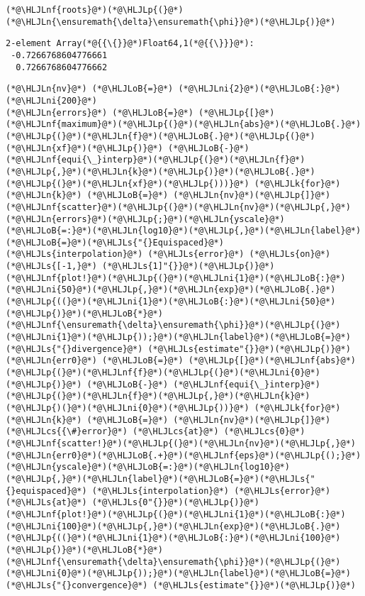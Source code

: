 \documentclass[12pt,a4paper]{article}
\newcommand{\HLJLk}[1]{\textcolor[RGB]{148,91,176}{\textbf{#1}}}
\newcommand{\HLJLn}[1]{#1}
\newcommand{\HLJLnf}[1]{\textcolor[RGB]{66,102,213}{#1}}
\newcommand{\HLJLs}[1]{\textcolor[RGB]{201,61,57}{#1}}
\newcommand{\HLJLni}[1]{\textcolor[RGB]{59,151,46}{#1}}
\newcommand{\HLJLoB}[1]{\textcolor[RGB]{102,102,102}{\textbf{#1}}}
\newcommand{\HLJLp}[1]{#1}
\newcommand{\HLJLcs}[1]{\textcolor[RGB]{153,153,119}{\textit{#1}}}
\begin{document}
\begin{lstlisting}
(*@\HLJLnf{roots}@*)(*@\HLJLp{(}@*)(*@\HLJLn{\ensuremath{\delta}\ensuremath{\phi}}@*)(*@\HLJLp{)}@*)
\end{lstlisting}

\begin{lstlisting}
2-element Array(*@{{\{}}@*)Float64,1(*@{{\}}}@*):
 -0.7266768604776661
  0.7266768604776662
\end{lstlisting}


\begin{lstlisting}
(*@\HLJLn{nv}@*) (*@\HLJLoB{=}@*) (*@\HLJLni{2}@*)(*@\HLJLoB{:}@*)(*@\HLJLni{200}@*)
(*@\HLJLn{errors}@*) (*@\HLJLoB{=}@*) (*@\HLJLp{[}@*)(*@\HLJLnf{maximum}@*)(*@\HLJLp{(}@*)(*@\HLJLn{abs}@*)(*@\HLJLoB{.}@*)(*@\HLJLp{(}@*)(*@\HLJLn{f}@*)(*@\HLJLoB{.}@*)(*@\HLJLp{(}@*)(*@\HLJLn{xf}@*)(*@\HLJLp{)}@*) (*@\HLJLoB{-}@*) (*@\HLJLnf{equi{\_}interp}@*)(*@\HLJLp{(}@*)(*@\HLJLn{f}@*)(*@\HLJLp{,}@*)(*@\HLJLn{k}@*)(*@\HLJLp{)}@*)(*@\HLJLoB{.}@*)(*@\HLJLp{(}@*)(*@\HLJLn{xf}@*)(*@\HLJLp{)))}@*) (*@\HLJLk{for}@*) (*@\HLJLn{k}@*) (*@\HLJLoB{=}@*) (*@\HLJLn{nv}@*)(*@\HLJLp{]}@*)
(*@\HLJLnf{scatter}@*)(*@\HLJLp{(}@*)(*@\HLJLn{nv}@*)(*@\HLJLp{,}@*)(*@\HLJLn{errors}@*)(*@\HLJLp{;}@*)(*@\HLJLn{yscale}@*)(*@\HLJLoB{=:}@*)(*@\HLJLn{log10}@*)(*@\HLJLp{,}@*)(*@\HLJLn{label}@*)(*@\HLJLoB{=}@*)(*@\HLJLs{"{}Equispaced}@*) (*@\HLJLs{interpolation}@*) (*@\HLJLs{error}@*) (*@\HLJLs{on}@*) (*@\HLJLs{[-1,}@*) (*@\HLJLs{1]"{}}@*)(*@\HLJLp{)}@*)
(*@\HLJLnf{plot!}@*)(*@\HLJLp{(}@*)(*@\HLJLni{1}@*)(*@\HLJLoB{:}@*)(*@\HLJLni{50}@*)(*@\HLJLp{,}@*)(*@\HLJLn{exp}@*)(*@\HLJLoB{.}@*)(*@\HLJLp{((}@*)(*@\HLJLni{1}@*)(*@\HLJLoB{:}@*)(*@\HLJLni{50}@*)(*@\HLJLp{)}@*)(*@\HLJLoB{*}@*)(*@\HLJLnf{\ensuremath{\delta}\ensuremath{\phi}}@*)(*@\HLJLp{(}@*)(*@\HLJLni{1}@*)(*@\HLJLp{));}@*)(*@\HLJLn{label}@*)(*@\HLJLoB{=}@*)(*@\HLJLs{"{}divergence}@*) (*@\HLJLs{estimate"{}}@*)(*@\HLJLp{)}@*)
(*@\HLJLn{err0}@*) (*@\HLJLoB{=}@*) (*@\HLJLp{[}@*)(*@\HLJLnf{abs}@*)(*@\HLJLp{(}@*)(*@\HLJLnf{f}@*)(*@\HLJLp{(}@*)(*@\HLJLni{0}@*)(*@\HLJLp{)}@*) (*@\HLJLoB{-}@*) (*@\HLJLnf{equi{\_}interp}@*)(*@\HLJLp{(}@*)(*@\HLJLn{f}@*)(*@\HLJLp{,}@*)(*@\HLJLn{k}@*)(*@\HLJLp{)(}@*)(*@\HLJLni{0}@*)(*@\HLJLp{))}@*) (*@\HLJLk{for}@*) (*@\HLJLn{k}@*) (*@\HLJLoB{=}@*) (*@\HLJLn{nv}@*)(*@\HLJLp{]}@*) (*@\HLJLcs{{\#}error}@*) (*@\HLJLcs{at}@*) (*@\HLJLcs{0}@*)
(*@\HLJLnf{scatter!}@*)(*@\HLJLp{(}@*)(*@\HLJLn{nv}@*)(*@\HLJLp{,}@*)(*@\HLJLn{err0}@*)(*@\HLJLoB{.+}@*)(*@\HLJLnf{eps}@*)(*@\HLJLp{();}@*)(*@\HLJLn{yscale}@*)(*@\HLJLoB{=:}@*)(*@\HLJLn{log10}@*)(*@\HLJLp{,}@*)(*@\HLJLn{label}@*)(*@\HLJLoB{=}@*)(*@\HLJLs{"{}equispaced}@*) (*@\HLJLs{interpolation}@*) (*@\HLJLs{error}@*) (*@\HLJLs{at}@*) (*@\HLJLs{0"{}}@*)(*@\HLJLp{)}@*)
(*@\HLJLnf{plot!}@*)(*@\HLJLp{(}@*)(*@\HLJLni{1}@*)(*@\HLJLoB{:}@*)(*@\HLJLni{100}@*)(*@\HLJLp{,}@*)(*@\HLJLn{exp}@*)(*@\HLJLoB{.}@*)(*@\HLJLp{((}@*)(*@\HLJLni{1}@*)(*@\HLJLoB{:}@*)(*@\HLJLni{100}@*)(*@\HLJLp{)}@*)(*@\HLJLoB{*}@*)(*@\HLJLnf{\ensuremath{\delta}\ensuremath{\phi}}@*)(*@\HLJLp{(}@*)(*@\HLJLni{0}@*)(*@\HLJLp{));}@*)(*@\HLJLn{label}@*)(*@\HLJLoB{=}@*)(*@\HLJLs{"{}convergence}@*) (*@\HLJLs{estimate"{}}@*)(*@\HLJLp{)}@*)
\end{lstlisting}
\end{document}
